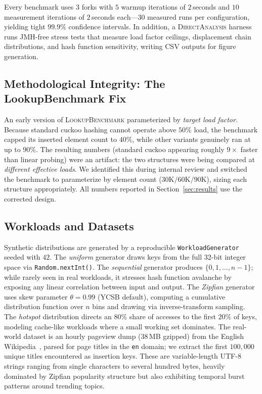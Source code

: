 \documentclass[10pt,journal,compsoc]{IEEEtran}
\begin{document}
Every benchmark uses $3$ forks with $5$ warmup iterations of $2$\,seconds and $10$ measurement iterations of $2$\,seconds each---$30$ measured runs per configuration, yielding tight $99.9\%$ confidence intervals. In addition, a \textsc{DirectAnalysis} harness runs JMH-free stress tests that measure load factor ceilings, displacement chain distributions, and hash function sensitivity, writing CSV outputs for figure generation.

\subsection{Methodological Integrity: The LookupBenchmark Fix}
An early version of \textsc{LookupBenchmark} parameterized by \emph{target load factor}. Because standard cuckoo hashing cannot operate above $50\%$ load, the benchmark capped its inserted element count to $40\%$, while other variants genuinely ran at up to $90\%$. The resulting numbers (standard cuckoo appearing roughly $9\times$ faster than linear probing) were an artifact: the two structures were being compared at \emph{different effective loads}. We identified this during internal review and switched the benchmark to parameterize by element count ($30\mathrm{K}/60\mathrm{K}/90\mathrm{K}$), sizing each structure appropriately. All numbers reported in Section~\ref{sec:results} use the corrected design.

\subsection{Workloads and Datasets}
Synthetic distributions are generated by a reproducible \texttt{WorkloadGenerator} seeded with $42$. The \emph{uniform} generator draws keys from the full $32$-bit integer space via \texttt{Random.nextInt()}. The \emph{sequential} generator produces $\{0,1,\ldots,n-1\}$; while rarely seen in real workloads, it stresses hash function avalanche by exposing any linear correlation between input and output. The \emph{Zipfian} generator uses skew parameter $\theta=0.99$ (YCSB default), computing a cumulative distribution function over $n$ bins and drawing via inverse-transform sampling. The \emph{hotspot} distribution directs an $80\%$ share of accesses to the first $20\%$ of keys, modeling cache-like workloads where a small working set dominates. The real-world dataset is an hourly pageview dump (38\,MB gzipped) from the English Wikipedia~\cite{wikipedia_pageviews}, parsed for page titles in the \texttt{en} domain; we extract the first $100{,}000$ unique titles encountered as insertion keys. These are variable-length UTF-8 strings ranging from single characters to several hundred bytes, heavily dominated by Zipfian popularity structure but also exhibiting temporal burst patterns around trending topics.
\end{document}
